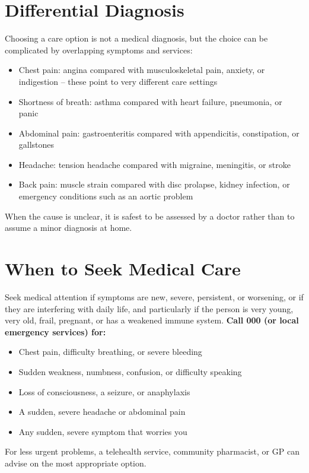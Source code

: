 \section*{Differential Diagnosis}
Choosing a care option is not a medical diagnosis, but the choice can be complicated by overlapping symptoms and services:
\begin{itemize}
    \item Chest pain: angina compared with musculoskeletal pain, anxiety, or indigestion -- these point to very different care settings
    \item Shortness of breath: asthma compared with heart failure, pneumonia, or panic
    \item Abdominal pain: gastroenteritis compared with appendicitis, constipation, or gallstones
    \item Headache: tension headache compared with migraine, meningitis, or stroke
    \item Back pain: muscle strain compared with disc prolapse, kidney infection, or emergency conditions such as an aortic problem
\end{itemize}
When the cause is unclear, it is safest to be assessed by a doctor rather than to assume a minor diagnosis at home.

\section*{When to Seek Medical Care}
Seek medical attention if symptoms are new, severe, persistent, or worsening, or if they are interfering with daily life, and particularly if the person is very young, very old, frail, pregnant, or has a weakened immune system.
\textbf{Call 000 (or local emergency services) for:}
\begin{itemize}
    \item Chest pain, difficulty breathing, or severe bleeding
    \item Sudden weakness, numbness, confusion, or difficulty speaking
    \item Loss of consciousness, a seizure, or anaphylaxis
    \item A sudden, severe headache or abdominal pain
    \item Any sudden, severe symptom that worries you
\end{itemize}
For less urgent problems, a telehealth service, community pharmacist, or GP can advise on the most appropriate option.

